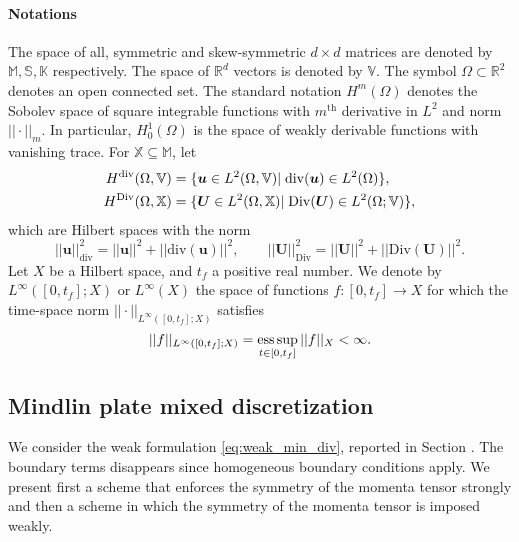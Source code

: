 \paragraph{Notations}
The space of all, symmetric and skew-symmetric $d\times d$ matrices are denoted by $\mathbb{M}, \mathbb{S}, \mathbb{K}$ respectively. The space of $\mathbb{R}^d$ vectors is denoted by $\mathbb{V}$. The symbol $\Omega \subset \mathbb{R}^2$ denotes an open connected set. The standard notation $H^m(\Omega)$ denotes the Sobolev space of square integrable functions with  $m^\text{th}$ derivative in $L^2$ and norm $||\cdot||_m$. In particular, $H^1_0(\Omega)$ is the space of weakly derivable functions with vanishing trace. For $\mathbb{X} \subseteq \mathbb{M}$, let
\begin{equation*}
\begin{aligned}
H^{\operatorname{div}}(\Omega, \mathbb{V}) &= \{\bm{u} \in L^2(\Omega, \mathbb{V}) \vert \; \mathrm{div}(\bm{u}) \in L^2(\Omega) \}, \\
H^{\operatorname*{Div}}(\Omega, \mathbb{X}) &= \{\bm{U} \in L^2(\Omega, \mathbb{X}) \vert \; \mathrm{Div}(\bm{U}) \in L^2(\Omega; \mathbb{V}) \},
\end{aligned}
\end{equation*}
which are Hilbert spaces with the norm 
\begin{equation*}
||\bm{u}||^2_{\text{div}} = ||\bm{u}||^2 + ||\mathrm{div}(\bm{u})||^2, \qquad
||\bm{U}||^2_{\text{Div}} = ||\bm{U}||^2 + ||\mathrm{Div}(\bm{U})||^2.
\end{equation*}
Let ${X}$ be a Hilbert space, and $t_f$ a positive real number. We denote by $L^\infty([0, t_f]; {X})$ or $L^\infty({X})$ the space of functions $f: [0, t_f] \rightarrow X$ for which the time-space norm $||\cdot||_{L^\infty([0, t_f]; {X})}$ satisfies
\[
||f||_{L^\infty([0, t_f]; {X})} = \operatorname*{ess\,sup}_{t \in [0,t_f]} ||f||_{{X}} < \infty.
\]

\subsection{Mindlin plate mixed discretization}
We consider the weak formulation \eqref{eq:weak_min_div}, reported in Section . The boundary terms disappears since homogeneous boundary conditions apply. We present first a scheme that enforces the symmetry of the momenta tensor strongly and then a scheme in which the symmetry of the momenta tensor is imposed weakly.


